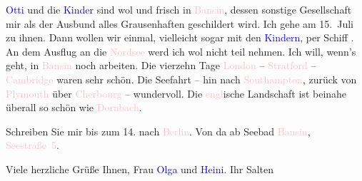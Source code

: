 \pstart
           \textcolor{blue}{Otti}{}\ledrightnote{\textcolor{blue}{Ottilie Salten}} und die \textcolor{blue}{Kinder}{}\ledrightnote{{$\rightarrow$}\textcolor{blue}{Anna Katharina Rehmann}{\newline}{$\rightarrow$}\textcolor{blue}{Paul Salten}} sind wol und frisch in \textcolor{pink}{Bansin}{}\ledrightnote{\textcolor{pink}{Bansin}}, dessen sonstige Gesellschaft mir als
               der Ausbund alles Grausenhaften geschildert wird. Ich gehe am 15. Juli zu ihnen. Dann wollen wir einmal, vielleicht sogar mit den \textcolor{blue}{Kindern}{}\ledrightnote{{$\rightarrow$}\textcolor{blue}{Anna Katharina Rehmann}{\newline}{$\rightarrow$}\textcolor{blue}{Paul Salten}}, per Schiff
                  \label{K_L03430-8v}\label{K_L03430-8h}. An dem Ausflug an die \textcolor{pink}{Nordsee}{}\ledrightnote{\textcolor{pink}{Nordsee}} werd ich wol nicht teil nehmen. Ich will, wenn’s geht, in \textcolor{pink}{Bansin}{}\ledrightnote{\textcolor{pink}{Bansin}} noch arbeiten. Die vierzehn Tage \textcolor{pink}{London}{}\ledrightnote{\textcolor{pink}{London}} – \textcolor{pink}{Stratford}{}\ledrightnote{\textcolor{pink}{Stratford-upon-Avon}} – \textcolor{pink}{Cambridge}{}\ledrightnote{\textcolor{pink}{Cambridge}} waren sehr schön.
               Die Seefahrt – hin nach \textcolor{pink}{Southampton}{}\ledrightnote{\textcolor{pink}{Southampton}}, zurück von
                  \textcolor{pink}{Plymouth}{}\ledrightnote{\textcolor{pink}{Plymouth}} über \textcolor{pink}{Cherbourg}{}\ledrightnote{\textcolor{pink}{Cherbourg-Octeville}} – wundervoll. Die \textcolor{pink}{engl}{}\ledrightnote{{$\rightarrow$}\textcolor{pink}{England}}ische Landschaft ist beinahe überall so
               schön wie \textcolor{pink}{Dornbach}{}\ledrightnote{\textcolor{pink}{Dornbach}}.\pend
           
\pstart
           Schreiben Sie mir bis zum 14. nach \textcolor{pink}{Berlin}{}\ledrightnote{\textcolor{pink}{Berlin}}. Von da ab Seebad \textcolor{pink}{Bansin}{}\ledrightnote{\textcolor{pink}{Bansin}}, \textcolor{pink}{Seestraße 5}{}\ledrightnote{\textcolor{pink}{Seestraße}}.\pend
           
\pstart
           Viele herzliche Grüße Ihnen, Frau \textcolor{blue}{Olga}{}\ledrightnote{\textcolor{blue}{Olga Schnitzler}} und \textcolor{blue}{Heini}{}\ledrightnote{\textcolor{blue}{Heinrich Schnitzler}}.\pend
           \pstart Ihr \spacefill\mbox{Salten}\pend{}\endnumbering{}  
      